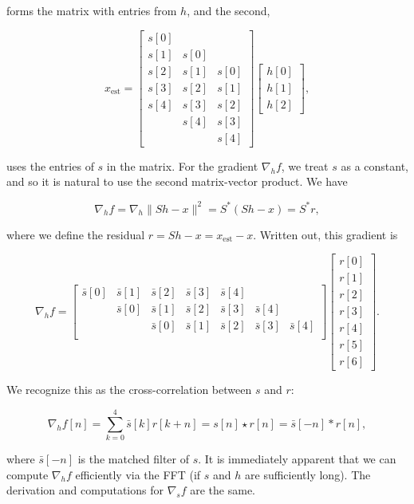 \documentclass[journal]{IEEEtran}
\begin{document}
\noindent forms the matrix with entries from $h$, and the second,

\[ x_\text{est} = \begin{bmatrix} s[0]\\s[1]&s[0]\\s[2]&s[1]&s[0]\\s[3]&s[2]&s[1]\\s[4]&s[3]&s[2]\\&s[4]&s[3]\\&&s[4]\end{bmatrix}\begin{bmatrix}h[0]\\h[1]\\h[2]\end{bmatrix}, \] 

\noindent uses the entries of $s$ in the matrix.  For the gradient $\nabla_hf$, we treat $s$ as a constant, and so it is natural to use the second matrix-vector product.  We have

\[ \nabla_hf = \nabla_h\|Sh-x\|^2 = S^\ast(Sh-x) = S^\ast r, \] 

\noindent where we define the residual $r=Sh-x = x_\text{est}-x$.  Written out, this gradient is

\[ \nabla_h f = \begin{bmatrix} \bar{s}[0]&\bar{s}[1]&\bar{s}[2]&\bar{s}[3]&\bar{s}[4]\\&\bar{s}[0]&\bar{s}[1]&\bar{s}[2]&\bar{s}[3]&\bar{s}[4]\\&&\bar{s}[0]&\bar{s}[1]&\bar{s}[2]&\bar{s}[3]&\bar{s}[4]\\\end{bmatrix}\begin{bmatrix}r[0]\\r[1]\\r[2]\\r[3]\\r[4]\\r[5]\\r[6]\end{bmatrix}. \] 

\noindent We recognize this as the cross-correlation between $s$ and $r$:

\[ \nabla_h f[n] = \sum_{k=0}^4 \bar{s}[k]r[k+n] = s[n]\star r[n] = \bar{s}[-n]\ast r[n], \]

\noindent where $\bar{s}[-n]$ is the matched filter of $s$.  It is immediately apparent that we can compute $\nabla_hf$ efficiently via the FFT (if $s$ and $h$ are sufficiently long).  The derivation and computations for $\nabla_sf$ are the same.\\
\end{document}
